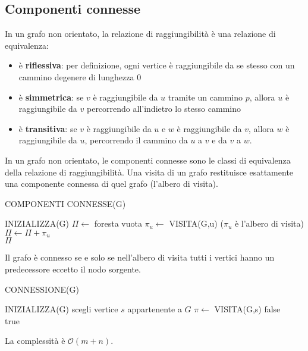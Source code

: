 \documentclass[11pt]{article}
\theoremstyle{proprietà}
\begin{document}
\subsection{Componenti connesse}
In un grafo non orientato, la relazione di raggiungibilità è una relazione di equivalenza:
\begin{itemize}
    \item è \textbf{riflessiva}: per definizione, ogni vertice è raggiungibile da se stesso con un cammino degenere di 
    lunghezza 0
    \item è \textbf{simmetrica}: se $v$ è raggiungibile da $u$ tramite un cammino $p$, allora $u$ è raggiungibile da $v$ 
    percorrendo all'indietro lo stesso cammino
    \item è \textbf{transitiva}: se $v$ è raggiungibile da $u$ e $w$ è raggiungibile da $v$, allora $w$ è raggiungibile 
    da $u$, percorrendo il cammino da $u$ a $v$ e da $v$ a $w$.
\end{itemize}
In un grafo non orientato, le componenti connesse sono le classi di equivalenza della relazione di raggiungibilità. Una 
visita di un grafo restituisce esattamente una componente connessa di quel grafo (l'albero di visita).
\begin{algorithm}[H]
    \caption{COMPONENTI CONNESSE(G)}
    \begin{algorithmic}
        \State INIZIALIZZA(G)
        \State $\Pi \gets$ foresta vuota 
                \State $\pi_u \gets$ VISITA(G,u) ($\pi_u$ è l'albero di visita)
                \State $\Pi \gets \Pi+{\pi_u}$
            \EndIf 
        \EndFor\\
        \Return $\Pi$
    \end{algorithmic}
\end{algorithm}
Il grafo è connesso se e solo se nell'albero di visita tutti i vertici hanno un predecessore eccetto il nodo sorgente.
\begin{algorithm}
    \caption{CONNESSIONE(G)}
    \begin{algorithmic}
        \State INIZIALIZZA(G)
        \State scegli vertice $s$ appartenente a $G$
        \State $\pi \gets$ VISITA(G,s)
            \Return false 
            \EndIf
        \EndFor\\ 
        \Return true
    \end{algorithmic}
\end{algorithm}
La complessità è $\mathcal{O}(m+n)$.
\end{document}
